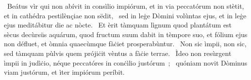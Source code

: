 ~Beátus vìr qui non abívit in consìlio impiórum, et in via peccatórum non stètit, et in cathédra pestilènçiae non sëdit, 
~sed in leġe Dòmini volùntas ejus, et in leġe ejus meditábitur die ac nòcte. 
~Et èrit tàmquam lìgnum quod plantátum est sècus decùrsüs aquárum, quod fructum suum dabit in tèmpore suo, et fólium ejus non défluet, et òmnia quaecùmque fàċiet prosperabùntur. 
~Non sic ìmpii, non sic, sed tàmquam pùlvis quem prójiċit vèntus a fàċie terrae. 
~Ìdeo non resùrgent ìmpii in judìċio, néque peccatóres in conċìlio justórum~; 
~quóniam novit Dòminus viam justórum, et ìter impiórum períbit. 
